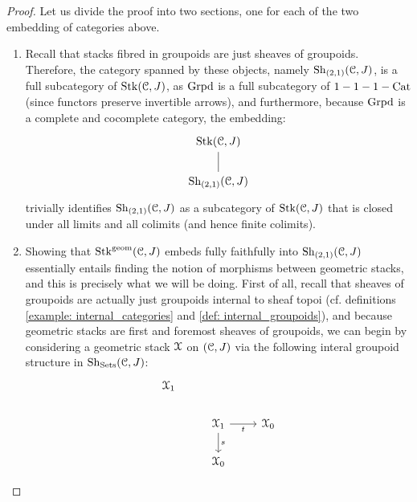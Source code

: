                         \begin{proof}
                            Let us divide the proof into two sections, one for each of the two embedding of categories above.
                            \begin{enumerate}
                                \item Recall that stacks fibred in groupoids are just sheaves of groupoids. Therefore, the category spanned by these objects, namely $\Sh_{(2,1)}(\C, J)$, is a full subcategory of $\Stk(\C, J)$, as $\Grpd$ is a full subcategory of $1-1-1-\Cat$ (since functors preserve invertible arrows), and furthermore, because $\Grpd$ is a complete and cocomplete category, the embedding:
                                    $$
                                        \begin{tikzcd}
                                        	{\Stk(\C, J)} \\
                                        	{\Sh_{(2,1)}(\C, J)}
                                        	\arrow[no head, from=2-1, to=1-1]
                                        \end{tikzcd}
                                    $$
                                trivially identifies $\Sh_{(2,1)}(\C, J)$ as a subcategory of $\Stk(\C, J)$ that is closed under all limits and all colimits (and hence finite colimits). 
                                \item Showing that $\Stk^{\geom}(\C, J)$ embeds fully faithfully into $\Sh_{(2,1)}(\C, J)$ essentially entails finding the  notion of morphisms between geometric stacks, and this is precisely what we will be doing. First of all, recall that sheaves of groupoids are actually just groupoids internal to sheaf topoi (cf. definitions \ref{example: internal_categories} and \ref{def: internal_groupoids}), and because geometric stacks are first and foremost sheaves of groupoids, we can begin by considering a geometric stack $\calX$ on $(\C, J)$ via the following interal groupoid structure in $\Sh_{\Sets}(\C, J)$:
                                    $$
                                        \begin{tikzcd}
                                        	{\calX_1} \\
                                        	& {\calX_1} & {\calX_0} \\
                                        	& {\calX_0}
                                        	\arrow["s", from=2-2, to=3-2]
                                        	\arrow["t"', from=2-2, to=2-3]

\end{tikzcd}$$
\end{enumerate}
\end{proof}
